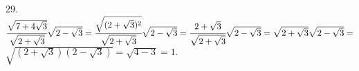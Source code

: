 29. $\cfrac{\sqrt{7+4\sqrt{3}}}{\sqrt{2+\sqrt{3}}}\sqrt{2-\sqrt{3}}=
\cfrac{\sqrt{(2+\sqrt{3})^2}}{\sqrt{2+\sqrt{3}}}\sqrt{2-\sqrt{3}}=
\cfrac{2+\sqrt{3}}{\sqrt{2+\sqrt{3}}}\sqrt{2-\sqrt{3}}=\sqrt{2+\sqrt{3}}\sqrt{2-\sqrt{3}}=$\\$\sqrt{(2+\sqrt{3})(2-\sqrt{3})}=\sqrt{4-3}=1.$\\

